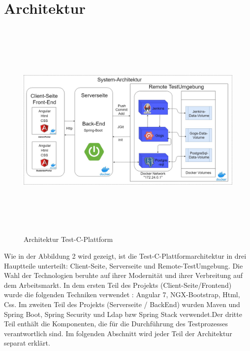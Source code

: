 \documentclass[a4paper,12pt,oneside]{book}
\begin{document}
\section{Architektur}
\begin{figure}[h!]
	\begin{center}
		\includegraphics[width=17cm, height=11cm]{Test-C-Plattform-Arch.jpg}
		\caption{Architektur Test-C-Plattform } 
		\label{ Architektur Test-C-Plattform } 
	\end{center}
\end{figure}
Wie in der Abbildung 2 wird gezeigt, ist die Test-C-Plattformarchitektur in drei Hauptteile unterteilt: Client-Seite, Serverseite und Remote-TestUmgebung.
\newline
Die Wahl der Technologien beruhte auf ihrer Modernität und ihrer Verbreitung auf dem Arbeitsmarkt. In dem ersten Teil des Projekts (Client-Seite/Frontend) wurde die folgenden Techniken verwendet : Angular 7, NGX-Bootstrap, Html, Css. Im zweiten Teil des Projekts (Serverseite / BackEnd) wurden Maven und Spring Boot, Spring Security und Ldap bzw Spring Stack verwendet.Der dritte Teil enthält die Komponenten, die für die Durchführung des Testprozesses verantwortlich sind.
\newline
Im folgenden Abschnitt wird jeder Teil der Architektur separat erklärt.
\newpage
\end{document}
